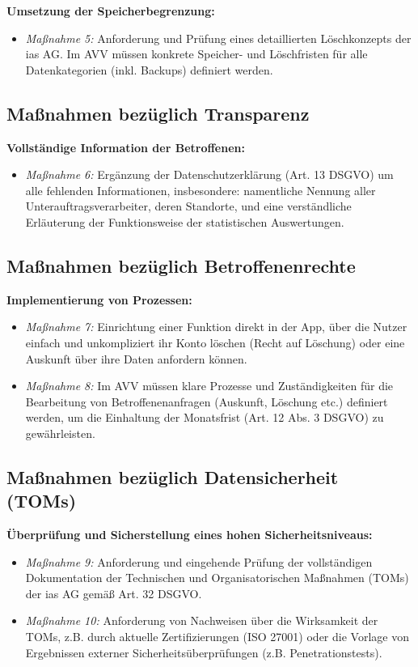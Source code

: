 \documentclass[12pt, a4paper]{article}
\begin{document}
\textbf{Umsetzung der Speicherbegrenzung:}
\begin{itemize}
    \item \textit{Maßnahme 5:} Anforderung und Prüfung eines detaillierten Löschkonzepts der ias AG. Im AVV müssen konkrete Speicher- und Löschfristen für alle Datenkategorien (inkl. Backups) definiert werden.
\end{itemize}

\subsection{Maßnahmen bezüglich Transparenz}
\textbf{Vollständige Information der Betroffenen:}
\begin{itemize}
    \item \textit{Maßnahme 6:} Ergänzung der Datenschutzerklärung (Art. 13 DSGVO) um alle fehlenden Informationen, insbesondere: namentliche Nennung aller Unterauftragsverarbeiter, deren Standorte, und eine verständliche Erläuterung der Funktionsweise der statistischen Auswertungen.
\end{itemize}

\subsection{Maßnahmen bezüglich Betroffenenrechte}
\textbf{Implementierung von Prozessen:}
\begin{itemize}
    \item \textit{Maßnahme 7:} Einrichtung einer Funktion direkt in der App, über die Nutzer einfach und unkompliziert ihr Konto löschen (Recht auf Löschung) oder eine Auskunft über ihre Daten anfordern können.
    \item \textit{Maßnahme 8:} Im AVV müssen klare Prozesse und Zuständigkeiten für die Bearbeitung von Betroffenenanfragen (Auskunft, Löschung etc.) definiert werden, um die Einhaltung der Monatsfrist (Art. 12 Abs. 3 DSGVO) zu gewährleisten.
\end{itemize}

\subsection{Maßnahmen bezüglich Datensicherheit (TOMs)}
\textbf{Überprüfung und Sicherstellung eines hohen Sicherheitsniveaus:}
\begin{itemize}
    \item \textit{Maßnahme 9:} Anforderung und eingehende Prüfung der vollständigen Dokumentation der Technischen und Organisatorischen Maßnahmen (TOMs) der ias AG gemäß Art. 32 DSGVO.
    \item \textit{Maßnahme 10:} Anforderung von Nachweisen über die Wirksamkeit der TOMs, z.B. durch aktuelle Zertifizierungen (ISO 27001) oder die Vorlage von Ergebnissen externer Sicherheitsüberprüfungen (z.B. Penetrationstests).
\end{itemize}
\end{document}
